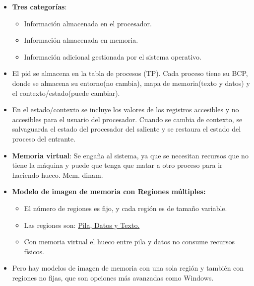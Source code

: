 \documentclass[12pt, twoside, openright]{report} %
\begin{document}
  \begin{itemize}
  \item \textbf{Tres categorías}:
    

    \begin{itemize}
    \item Información almacenada en el procesador.
      
    \item Información almacenada en memoria.
      
    \item Información adicional gestionada por el sistema operativo.
      
    \end{itemize}
  \item El pid se almacena en la tabla de procesos (TP). Cada proceso tiene
    su BCP, donde se almacena su entorno(no cambia), mapa de
    memoria(texto y datos) y el contexto/estado(puede cambiar).
    
  \item En el estado/contexto se incluye los valores de los registros
    accesibles y no accesibles para el usuario del procesador. Cuando se
    cambia de contexto, se salvaguarda el estado del procesador del
    saliente y se restaura el estado del proceso del entrante.
    
  \item \textbf{Memoria virtual}: Se engaña al sistema, ya que se necesitan
    recursos que no tiene la máquina y puede que tenga que matar a otro
    proceso para ir haciendo hueco. Mem. dinam.
    
  \item \textbf{Modelo de imagen de memoria con Regiones múltiples:}
    

    \begin{itemize}
    \item El número de regiones es fijo, y cada región es de tamaño
      variable.
      
    \item Las regiones son: \underline{Pila, Datos y Texto.}
      
    \item Con memoria virtual el hueco entre pila y datos no consume
      recursos físicos.
      
    \end{itemize}
  \item Pero hay modelos de imagen de memoria con una sola región y también
    con regiones no fijas, que son opciones más avanzadas como Windows.
    

\end{itemize}
\end{document}
